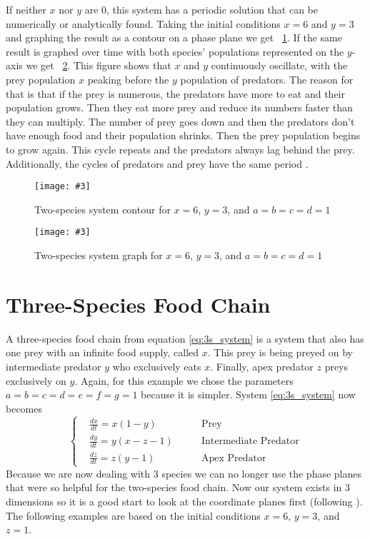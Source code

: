 \documentclass[12pt,a4paper,reqno]{amsart}
\newcommand{\figref}[1]{\textsc{\figurename}~\ref{#1}}
\newcommand{\makefig}[4]{
\begin{figure}[#1]
    \captionsetup{justification=centering}
    \texttt{[image: \#3]}
    \caption{#4}
    \label{fig:#3}
\end{figure}
}
\begin{document}
If neither $x$ nor $y$ are 0, this system has a periodic solution that can be
numerically or analytically found. Taking the initial conditions $x=6$ and
$y=3$ and graphing the result as a contour on a phase plane we get
\figref{fig:2s_contour}. If the same result is graphed over time with both
species' populations represented on the $y$-axis we get \figref{fig:2s_graph}.
This figure shows that $x$ and $y$ continuously oscillate, with the prey
population $x$ peaking before the $y$ population of predators. The reason for
that is that if the prey is numerous, the predators have more to eat and their
population grows. Then they eat more prey and reduce its numbers faster than
they can multiply. The number of prey goes down and then the predators don't
have enough food and their population shrinks. Then the prey population begins
to grow again. This cycle repeats and the predators always lag behind the prey.
Additionally, the cycles of predators and prey have the same period
\cite{chauvet}.
\makefig{h}{0.65\textwidth}{2s_contour}{Two-species
system contour for $x=6$, $y=3$, and $a=b=c=d=1$}
\makefig{h}{0.7\textwidth}{2s_graph}{Two-species system
graph for $x=6$, $y=3$, and $a=b=c=d=1$}


\section{Three-Species Food Chain}

A three-species food chain from equation \eqref{eq:3s_system} is a system that 
also has one prey with an infinite food supply, called $x$. This prey is being
preyed on by intermediate predator $y$ who exclusively eats $x$. Finally, apex
predator $z$ preys exclusively on $y$. Again, for this example we chose the 
parameters $a=b=c=d=e=f=g=1$ because it is simpler. System \eqref{eq:3s_system}
now becomes
\begin{equation}
    \left\{\begin{aligned}
        &\frac{dx}{dt} = x(1 - y)              &\text{Prey}\\
        &\frac{dy}{dt} = y(x - z - 1) \qquad &\text{Intermediate Predator}\\
        &\frac{dz}{dt} = z(y - 1)             &\text{Apex Predator}
    \end{aligned}\right.
    \label{eq:3s_example}
\end{equation}
Because we are now dealing with 3 species we can no longer use the phase planes
that were so helpful for the two-species food chain. Now our system exists in
3 dimensions so it is a good start to look at the coordinate planes first 
(following \cite{chauvet}). The following examples are based on the initial
conditions $x=6$, $y=3$, and $z=1$.
\end{document}
